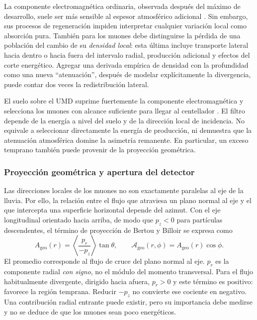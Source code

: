 La componente electromagnética ordinaria, observada después del máximo de desarrollo, suele ser más sensible al espesor atmosférico adicional \cite{Pryke1998,BradfieldThesis}. Sin embargo, sus procesos de regeneración impiden interpretar cualquier variación local como absorción pura. También para los muones debe distinguirse la pérdida de una población del cambio de su \emph{densidad local}: esta última incluye transporte lateral hacia dentro o hacia fuera del intervalo radial, producción adicional y efectos del corte energético. Agregar una derivada empírica de densidad con la profundidad como una nueva ``atenuación'', después de modelar explícitamente la divergencia, puede contar dos veces la redistribución lateral.

El suelo sobre el UMD suprime fuertemente la componente electromagnética y selecciona los muones con alcance suficiente para llegar al centellador \cite{UMD_Design2016}. El filtro depende de la energía a nivel del suelo y de la dirección local de incidencia. No equivale a seleccionar directamente la energía de producción, ni demuestra que la atenuación atmosférica domine la asimetría remanente. En particular, un exceso temprano también puede provenir de la proyección geométrica.

\subsubsection{Proyección geométrica y apertura del detector}
\label{subsubsec:divergencia}

Las direcciones locales de los muones no son exactamente paralelas al eje de la lluvia. Por ello, la relación entre el flujo que atraviesa un plano normal al eje y el que intercepta una superficie horizontal depende del azimut. Con el eje longitudinal orientado hacia arriba, de modo que $p_z<0$ para partículas descendentes, el término de proyección de Bertou y Billoir se expresa como \cite{GAP2000_017}
\begin{equation}
A_{\mathrm{geo}}(r)=
\left\langle\frac{p_r}{-p_z}\right\rangle\tan\theta,
\qquad
\mathcal A_{\mathrm{geo}}(r,\phi)=A_{\mathrm{geo}}(r)\cos\phi.
\label{eq:efecto_geo}
\end{equation}
El promedio corresponde al flujo de cruce del plano normal al eje. $p_r$ es la componente radial \emph{con signo}, no el módulo del momento transversal. Para el flujo habitualmente divergente, dirigido hacia afuera, $p_r>0$ y este término es positivo: favorece la región temprana. Reducir $-p_z$ no convierte ese cociente en negativo. Una contribución radial entrante puede existir, pero su importancia debe medirse y no se deduce de que los muones sean poco energéticos.


